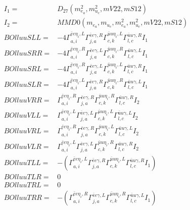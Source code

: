 \documentclass[A4,landscape]{article}
\begin{document}
\begin{align} 
I_1 = & D_{27}(m^2_{e_{{a}}}, m^2_{u_{{c}}}, mV22, mS12) \\ 
I_2 = & MMD0(m_{e_{{a}}}, m_{u_{{c}}}, m^2_{e_{{a}}}, m^2_{u_{{c}}}, mV22, mS12) \\ 
  BOlluuSLL= & -4  \Gamma^{\bar{e}e \eta_i ,L}_{a, i} \Gamma^{\bar{e}e \gamma ,R}_{j, a} \Gamma^{\bar{u}u \eta_i ,L}_{c, k} \Gamma^{\bar{u}u \gamma ,R}_{l, c} I_1 \\ 
  BOlluuSRR= & -4  \Gamma^{\bar{e}e \eta_i ,R}_{a, i} \Gamma^{\bar{e}e \gamma ,L}_{j, a} \Gamma^{\bar{u}u \eta_i ,R}_{c, k} \Gamma^{\bar{u}u \gamma ,L}_{l, c} I_1 \\ 
  BOlluuSRL= & -4  \Gamma^{\bar{e}e \eta_i ,R}_{a, i} \Gamma^{\bar{e}e \gamma ,L}_{j, a} \Gamma^{\bar{u}u \eta_i ,L}_{c, k} \Gamma^{\bar{u}u \gamma ,R}_{l, c} I_1 \\ 
  BOlluuSLR= & -4  \Gamma^{\bar{e}e \eta_i ,L}_{a, i} \Gamma^{\bar{e}e \gamma ,R}_{j, a} \Gamma^{\bar{u}u \eta_i ,R}_{c, k} \Gamma^{\bar{u}u \gamma ,L}_{l, c} I_1 \\ 
  BOlluuVRR= &  \Gamma^{\bar{e}e \eta_i ,R}_{a, i} \Gamma^{\bar{e}e \gamma ,R}_{j, a} \Gamma^{\bar{u}u \eta_i ,R}_{c, k} \Gamma^{\bar{u}u \gamma ,R}_{l, c} I_2 \\ 
  BOlluuVLL= &  \Gamma^{\bar{e}e \eta_i ,L}_{a, i} \Gamma^{\bar{e}e \gamma ,L}_{j, a} \Gamma^{\bar{u}u \eta_i ,L}_{c, k} \Gamma^{\bar{u}u \gamma ,L}_{l, c} I_2 \\ 
  BOlluuVRL= &  \Gamma^{\bar{e}e \eta_i ,R}_{a, i} \Gamma^{\bar{e}e \gamma ,R}_{j, a} \Gamma^{\bar{u}u \eta_i ,L}_{c, k} \Gamma^{\bar{u}u \gamma ,L}_{l, c} I_2 \\ 
  BOlluuVLR= &  \Gamma^{\bar{e}e \eta_i ,L}_{a, i} \Gamma^{\bar{e}e \gamma ,L}_{j, a} \Gamma^{\bar{u}u \eta_i ,R}_{c, k} \Gamma^{\bar{u}u \gamma ,R}_{l, c} I_2 \\ 
  BOlluuTLL= & -( \Gamma^{\bar{e}e \eta_i ,L}_{a, i} \Gamma^{\bar{e}e \gamma ,R}_{j, a} \Gamma^{\bar{u}u \eta_i ,L}_{c, k} \Gamma^{\bar{u}u \gamma ,R}_{l, c} I_1) \\ 
  BOlluuTLR= & 0 \\ 
  BOlluuTRL= & 0 \\ 
  BOlluuTRR= & -( \Gamma^{\bar{e}e \eta_i ,R}_{a, i} \Gamma^{\bar{e}e \gamma ,L}_{j, a} \Gamma^{\bar{u}u \eta_i ,R}_{c, k} \Gamma^{\bar{u}u \gamma ,L}_{l, c} I_1) \\ 
\end{align} 
\end{document}
